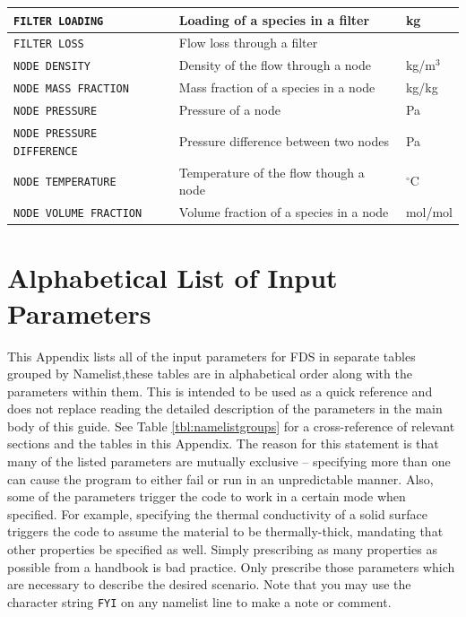 \documentclass[11pt]{book}
\newcommand{\ct}{\tt\small}
\begin{document}
\begin{longtable}{|l|l|l|@{\extracolsep{\fill}}}
{\ct FILTER LOADING}                            & Loading of a species in a filter          &  kg                   \\ \hline
{\ct FILTER LOSS}                               & Flow loss through a filter                &                       \\ \hline
{\ct NODE DENSITY}                              & Density of the flow through a node        &  kg/m$^3$             \\ \hline
{\ct NODE MASS FRACTION}                        & Mass fraction of a species in a node      &  kg/kg                \\ \hline
{\ct NODE PRESSURE}                             & Pressure of a node                        &       Pa              \\ \hline
{\ct NODE PRESSURE DIFFERENCE}                  & Pressure difference between two nodes                        &       Pa              \\ \hline
{\ct NODE TEMPERATURE}                          & Temperature of the flow though a node     & $^\circ$C             \\ \hline
{\ct NODE VOLUME FRACTION}                      & Volume fraction of a species in a node    &  mol/mol              \\ \hline
\end{longtable}



\chapter{Alphabetical List of Input Parameters}

This Appendix lists all of the input parameters for FDS in separate tables grouped by Namelist,these tables are in alphabetical order along with the parameters within them. This is intended to be used as a quick reference and does not replace reading the detailed description of the parameters in the main body of this guide. See Table \ref{tbl:namelistgroups} for a cross-reference of relevant sections and the tables in this Appendix. The reason for this statement is that many of the listed parameters are mutually exclusive -- specifying more than one can cause the program to either fail or run in an unpredictable manner. Also, some of the parameters trigger the code to work in a certain mode when specified. For example, specifying the thermal conductivity of a solid surface triggers the code to assume the material to be thermally-thick, mandating that other
properties be specified as well. Simply prescribing as many properties as possible from a handbook is bad practice. Only prescribe those parameters which are necessary to describe the desired scenario. Note that you may use the character string {\ct FYI} on any namelist line to make a note or comment.
\end{document}

